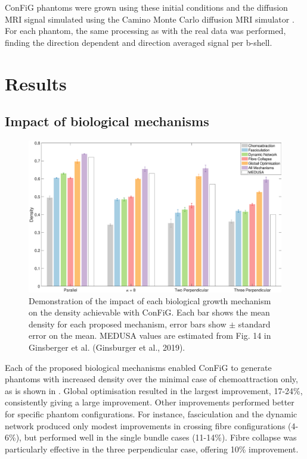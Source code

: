 ConFiG phantoms were grown using these initial conditions and the diffusion MRI signal simulated using the Camino Monte Carlo diffusion MRI simulator \cite{Hall2009}. For each phantom, the same processing as with the real data was performed, finding the direction dependent and direction averaged signal per b-shell.

\section{Results}
\label{sec:config_results}

\subsection{Impact of biological mechanisms}
\label{sec:config_result_impact_of_mechanisms}

\begin{figure}
  \centering
  \includegraphics[width=\textwidth]{figures/config/improvements_wfascicle_tight.eps}
  \caption[Impact of biological mechanisms in ConFiG]{Demonstration of the impact of each biological growth mechanism on the density achievable with ConFiG. Each bar shows the mean density for each proposed mechanism, error bars show $\pm$ standard error on the mean. MEDUSA values are estimated from Fig. 14 in Ginsberger et al. (Ginsburger et al., 2019).}
  \label{fig:config_res_improvements}
\end{figure}

Each of the proposed biological mechanisms enabled ConFiG to generate phantoms with increased density over the minimal case of chemoattraction only, as is shown in . Global optimisation resulted in the largest improvement, 17-24\%, consistently giving a large improvement. Other improvements performed better for specific phantom configurations. For instance, fasciculation and the dynamic network produced only modest improvements in crossing fibre configurations (4-6\%), but performed well in the single bundle cases (11-14\%). Fibre collapse was particularly effective in the three perpendicular case, offering 10\% improvement.

